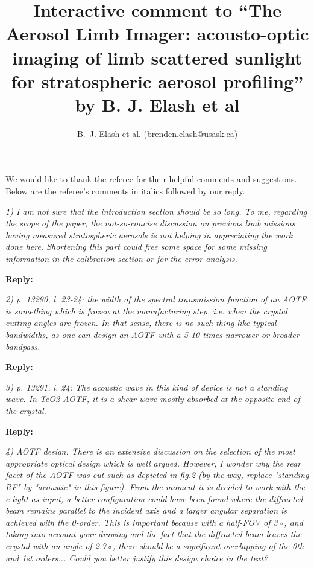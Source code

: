 \documentclass[12pt, notitlepage]{article}
\title{Interactive comment to ``The Aerosol Limb Imager: acousto-optic imaging of limb scattered
sunlight for stratospheric aerosol profiling'' by B. J. Elash et al}
\author{B.~J. Elash et al. (brenden.elash@usask.ca)}
\begin{document}
\begin{titlepage}
\maketitle
\end{titlepage}


We would like to thank the referee for their helpful comments and suggestions. Below are the referee's comments in italics followed by our reply.

\hrulefill

\textit{1) I am not sure that the introduction section should be so long. To me, regarding the
scope of the paper, the not-so-concise discussion on previous limb missions having
measured stratospheric aerosols is not helping in appreciating the work done here.
Shortening this part could free some space for some missing information in the calibration
section or for the error analysis.}

\textbf{Reply:}

\hrulefill

\textit{2) p. 13290, l. 23-24: the width of the spectral transmission function of an AOTF
is something which is frozen at the manufacturing step, i.e. when the crystal cutting
angles are frozen. In that sense, there is no such thing like typical bandwidths, as one
can design an AOTF with a 5-10 times narrower or broader bandpass.}

\textbf{Reply:}

\hrulefill

\textit{3) p. 13291, l. 24: The acoustic wave in this kind of device is not a standing wave. In
TeO2 AOTF, it is a shear wave mostly absorbed at the opposite end of the crystal.}

\textbf{Reply:}

\hrulefill

\textit{4) AOTF design. There is an extensive discussion on the selection of the most appropriate
optical design which is well argued. However, I wonder why the rear facet of the
AOTF was cut such as depicted in fig.2 (by the way, replace "standing RF" by "acoustic"
in this figure). From the moment it is decided to work with the e-light as input, a
better configuration could have been found where the diffracted beam remains parallel
to the incident axis and a larger angular separation is achieved with the 0-order. This is
important because with a half-FOV of 3◦, and taking into account your drawing and the
fact that the diffracted beam leaves the crystal with an angle of 2.7◦, there should be a
significant overlapping of the 0th and 1st orders... Could you better justify this design
choice in the text?}
\end{document}
